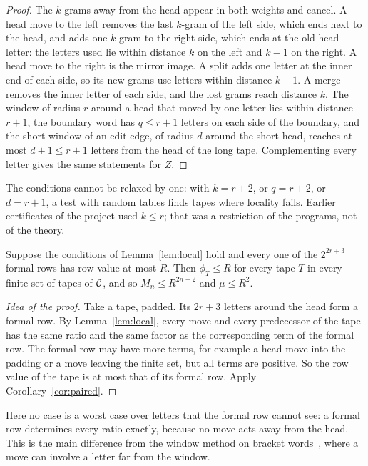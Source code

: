 \begin{proof}
The $k$-grams away from the head appear in both weights and cancel. A head move to the left removes the last $k$-gram
of the left side, which ends next to the head, and adds one $k$-gram to the right side, which ends at the old head
letter: the letters used lie within distance $k$ on the left and $k-1$ on the right. A head move to the right is the
mirror image. A split adds one letter at the inner end of each side, so its new grams use letters within distance
$k-1$. A merge removes the inner letter of each side, and the lost grams reach distance $k$. The window of radius $r$
around a head that moved by one letter lies within distance $r+1$, the boundary word has $q\le r+1$ letters on each
side of the boundary, and the short window of an edit edge, of radius $d$ around the short head, reaches at most $d+1\le r+1$ letters
from the head of the long tape. Complementing every letter gives the same statements for $Z$.
\end{proof}

The conditions cannot be relaxed by one: with $k=r+2$, or $q=r+2$, or $d=r+1$, a test with random tables finds tapes
where locality fails. Earlier certificates of the project used $k\le r$; that was a restriction of the programs, not
of the theory.

\begin{proposition}\label{prop:rows}
Suppose the conditions of Lemma~\ref{lem:local} hold and every one of the $2^{2r+3}$ formal rows has row value at
most $R$. Then $\phi_T\le R$ for every tape $T$ in every finite set of tapes of $\mathcal{C}$, and so $M_n\le R^{2n-2}$ and
$\mu\le R^2$.
\end{proposition}

\begin{proof}[Idea of the proof]
Take a tape, padded. Its $2r+3$ letters around the head form a formal row. By Lemma~\ref{lem:local}, every move and
every predecessor of the tape has the same ratio and the same factor as the corresponding term of the formal row.
The formal row may have more terms, for example a head move into the padding or a move leaving the finite set, but
all terms are positive. So the row value of the tape is at most that of its formal row. Apply
Corollary~\ref{cor:paired}.
\end{proof}

Here no case is a worst case over letters that the formal row cannot see: a formal row determines every ratio
exactly, because no move acts away from the head. This is the main difference from the window method on bracket
words~\cite{BoundsPaper}, where a move can involve a letter far from the window.

